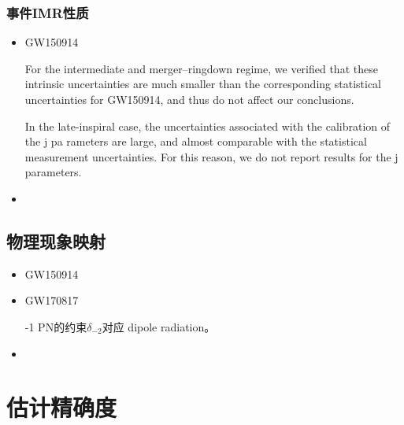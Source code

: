 \documentclass[CJK]{paper}  %
\begin{document}
\subsubsection{事件IMR性质}
\begin{itemize}
	\item[1. ] GW150914\cite{test_GR_GW150914}
		\par For the intermediate and merger–ringdown regime, we
		verified that these intrinsic uncertainties are much smaller than
		the corresponding statistical uncertainties for GW150914, and
		thus do not affect our conclusions.
		\par  In the late-inspiral case,
		the uncertainties associated with the calibration of the j pa
		rameters are large, and almost comparable with the statistical
		measurement uncertainties. For this reason, we do not report
		results for the j parameters.
	\item[] 
\end{itemize}

\subsection{物理现象映射}
\begin{itemize}
	\item[1. ] GW150914\cite{test_GR_GW150914}
	\item[2. ] GW170817\cite{test_GR_GW170817}
		\par -1 PN的约束$\delta_{-2}$对应 dipole radiation。
	\item[] 
\end{itemize}


\newpage
\section{估计精确度}
\end{document}
